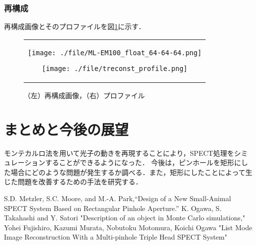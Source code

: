\documentclass[dvipdfmx,autodetect-engine,twocolumn,10pt]{jsarticle}%
\begin{document}
\subsubsection{再構成}
再構成画像とそのプロファイルを図\ref{reconst}に示す．
\begin{figure}[htbp]
  \begin{center}
    \begin{tabular}{c}
      \begin{minipage}{0.5\hsize}
        \begin{center}
          \texttt{[image: ./file/ML-EM100\_float\_64-64-64.png]}
        \end{center}
      \end{minipage}
      \begin{minipage}{0.5\hsize}
        \begin{center}
          \texttt{[image: ./file/treconst\_profile.png]}
        \end{center}
      \end{minipage}
    \end{tabular}
  \caption{（左）再構成画像，（右）プロファイル}
  \label{reconst}
  \end{center}
\end{figure}
\section{まとめと今後の展望}
モンテカルロ法を用いて光子の動きを再現することにより，SPECT処理をシミュレーションすることができるようになった．
今後は，ピンホールを矩形にした場合にどのような問題が発生するか調べる．また，矩形にしたことによって生じた問題を改善するための手法を研究する．

\begin{thebibliography}{9}
   S.D. Metzler, S.C. Moore, and M.-A. Park,“Design of a New Small-Animal SPECT System Based on Rectangular Pinhole Aperture.”
   K. Ogawa, S. Takahashi and Y. Satori "Description of an object in Monte Carlo simulations,"
   Yohei Fujishiro, Kazumi Murata, Nobutoku Motomura, Koichi Ogawa "List Mode Image Reconstruction With a Multi-pinhole Triple Head SPECT System"
\end{thebibliography}
\end{document}
